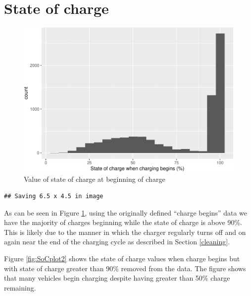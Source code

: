 \documentclass[]{article}
\begin{document}
\section{State of charge}\label{SoC}

\begin{figure}
\centering
\includegraphics{EVBB_report_files/figure-latex/SoCplot1-1.pdf}
\caption{\label{fig:SoCplot1}Value of state of charge at beginning of
charge}
\end{figure}

\begin{verbatim}
## Saving 6.5 x 4.5 in image
\end{verbatim}

As can be seen in Figure \ref{fig:SoCplot1}, using the originally
defined ``charge begins'' data we have the majority of charges beginning
while the state of charge is above 90\%. This is likely due to the
manner in which the charger regularly turns off and on again near the
end of the charging cycle as described in Section \ref{cleaning}.

Figure \ref{fig:SoCplot2} shows the state of charge values when charge
begins but with state of charge greater than 90\% removed from the data.
The figure shows that many vehicles begin charging despite having
greater than 50\% charge remaining.
\end{document}
